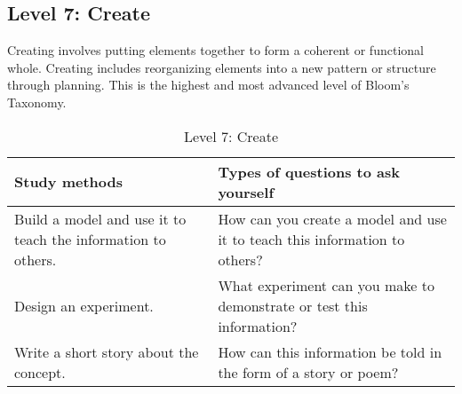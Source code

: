 \documentclass[../main.tex]{subfiles}
\begin{document}
\subsection{Level 7: Create}
Creating involves putting elements together to form a coherent or functional
whole. Creating includes reorganizing elements into a new pattern or structure
through planning. This is the highest and most advanced level of Bloom’s
Taxonomy.
%
\begin{table}[H]
  \begin{center}
    \begin{tabular}[c]{p{6cm}p{6cm}}
      \hline
      Study methods & Types of questions to ask yourself \\
      \hline
      Build a model and use it to teach the information to others. & How can you
      create a model and use it to teach this information to others? \\
      Design an experiment. &	What experiment can you make to demonstrate or
      test this information? \\
      Write a short story about the concept. & How can this information be told
      in the form of a story or poem? \\
      \hline
    \end{tabular}
    \caption{Level 7: Create}
  \end{center}
\end{table}
%
\end{document}

